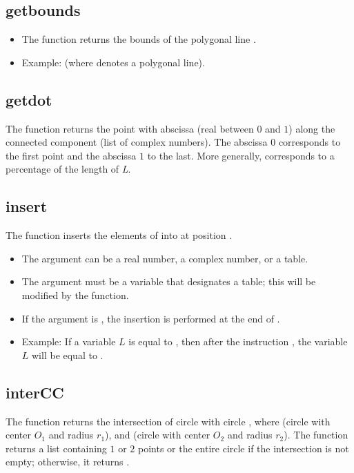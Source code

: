 \subsection{getbounds}

\begin{itemize}
    \item The function  returns the bounds  of the polygonal line .
    \item Example:  (where  denotes a polygonal line).
\end{itemize}

\subsection{getdot}
The function  returns the point with abscissa  (real between $0$ and $1$) along the connected component  (list of complex numbers). The abscissa $0$ corresponds to the first point and the abscissa $1$ to the last. More generally,  corresponds to a percentage of the length of \emph{L}.

\subsection{insert}
The function  inserts the elements of  into  at position .

\begin{itemize}
    \item The argument  can be a real number, a complex number, or a table.
    \item The argument  must be a variable that designates a table; this will be modified by the function.
    \item If the argument  is \nil, the insertion is performed at the end of .
    \item Example: If a variable $L$ is equal to , then after the instruction , the variable $L$ will be equal to .
\end{itemize}

\subsection{interCC}
The function  returns the intersection of circle  with circle , where  (circle with center $O_1$ and radius $r_1$), and  (circle with center $O_2$ and radius $r_2$). The function returns a list containing $1$ or $2$ points or the entire circle if the intersection is not empty; otherwise, it returns \nil.


